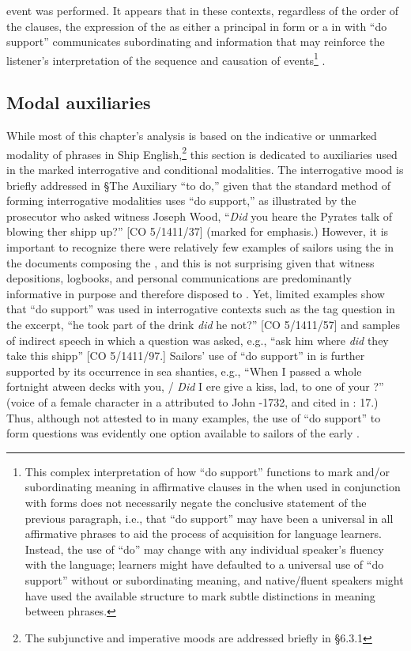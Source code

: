 event was performed. It appears that in these contexts, regardless of the order of the clauses, the expression of the  as either a principal  in  form or a  in  with “do support” communicates subordinating and  information that may reinforce the listener’s interpretation of the sequence and causation of events\footnote{This complex interpretation of how “do support” functions to mark  and/or subordinating meaning in affirmative clauses in the  when used in conjunction with  forms does not necessarily negate the conclusive statement of the previous paragraph, i.e., that “do support” may have been a universal in all affirmative  phrases to aid the process of acquisition for language learners. Instead, the use of “do” may change with any individual speaker’s fluency with the language; learners might have defaulted to a universal use of “do support” without  or subordinating meaning, and native/fluent speakers might have used the available structure to mark subtle distinctions in meaning between  phrases.} .  

\subsection{{Modal} {auxiliaries}}%

  While most of this chapter’s analysis is based on the indicative or unmarked modality of  phrases in Ship English,\footnote{The subjunctive and imperative moods are addressed briefly in §6.3.1} this section is dedicated to auxiliaries used in the marked interrogative and conditional modalities. The interrogative mood is briefly addressed in §The Auxiliary “to do,” given that the standard method of forming interrogative modalities uses “do support,” as illustrated by the prosecutor who asked witness Joseph Wood, “\textit{Did} you heare the Pyrates talk of blowing ther shipp up?” [CO 5/1411/37] (marked for emphasis.) However, it is important to recognize there were relatively few examples of sailors using the  in the documents composing the , and this is not surprising given that witness depositions, logbooks, and personal communications are predominantly informative in purpose and therefore disposed to . Yet, limited examples show that “do support” was used in interrogative contexts such as the tag question in the excerpt, “he took part of the drink \textit{did} he not?” [CO 5/1411/57] and samples of indirect speech in which a question was asked, e.g., “ask him where \textit{did} they take this shipp” [CO 5/1411/97.] Sailors’ use of “do support” in  is further supported by its occurrence in sea shanties, e.g., “When I passed a whole fortnight atween decks with you, / \textit{Did} I ere give a kiss, lad, to one of your ?” (voice of a female character in a  attributed to John \citealt{Gay1685}-1732, and cited in \citealt{Hugill1969}: 17.) Thus, although not attested to in many examples, the use of “do support” to form questions was evidently one option available to sailors of the early .   

